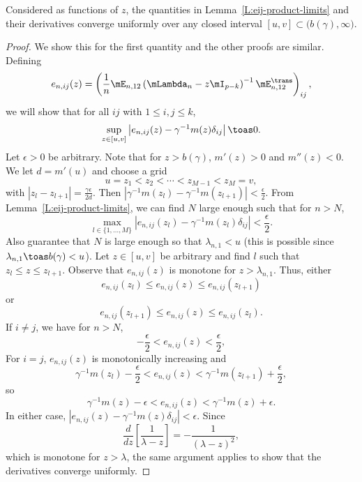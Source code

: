 \begin{lemma}\label{L:eij-product-limits-uniform}
    Considered as functions of $z$, the quantities in 
    Lemma~\ref{L:eij-product-limits} and their derivatives
    converge uniformly over any closed
    interval $[u,v] \subset \big( b(\gamma),\infty \big)$.
\end{lemma}
\begin{proof}
    We show this for the first quantity and the other proofs are similar.
    Defining
    \[
        e_{n,ij}(z)
        =
        \left(
            \frac{1}{n}
            \mE_{n,12}
            \left(
                \mLambda_n - z \mI_{p-k}
            \right)^{-1}
            \mE_{n,12}^\trans
        \right)_{ij},
    \]
    we will show that for all $ij$ with $1 \leq i,j \leq k$, 
    \[
        \sup_{z \in [u,v]} 
            \left|
                e_{n,ij}(z)
                    -
                    \gamma^{-1}
                    m(z)
                    \delta_{ij}
            \right|
            \toas 0.
    \]
    Let $\epsilon > 0$ be arbitrary.  Note that for 
    $z > b(\gamma)$, $m'(z) > 0$ and $m''(z) < 0$.  We let $d = m'(u)$ and
    choose a grid
    \[
        u = z_1 < z_2 < \cdots < z_{M-1} < z_M = v,
    \]
    with $|z_l - z_{l+1}| = \frac{\gamma \epsilon}{2 d}$.  
    Then $|\gamma^{-1} m(z_l) - \gamma^{-1} m(z_{l+1})| < \frac{\epsilon}{2}$.  
    From 
    Lemma~\ref{L:eij-product-limits}, we can find $N$ large enough such
    that for $n > N$, 
    \[
        \max_{l\in\{1, \ldots, M\}}
            \left|
                e_{n,ij}(z_l)
                    -
                    \gamma^{-1}
                    m(z_l)
                    \delta_{ij}
            \right|
            <
            \frac{\epsilon}{2}.
    \]
    Also guarantee that $N$ is large enough so that $\lambda_{n,1} < u$ 
    (this is possible since $\lambda_{n,1} \toas b(\gamma) < u$).
    Let $z \in [u,v]$ be arbitrary and find $l$ such that 
    $z_l \leq z \leq z_{l+1}$.
    Observe that $e_{n,ij}(z)$ is monotone for $z > \lambda_{n,1}$.  Thus,
    either
    \[
        e_{n,ij}(z_l) \leq e_{n,ij}(z) \leq e_{n,ij}(z_{l+1})
    \]
    or
    \[
        e_{n,ij}(z_{l+1}) \leq e_{n,ij}(z) \leq e_{n,ij}(z_{l}).
    \]
    If $i \neq j$, we have for $n > N$,
    \[
        -\frac{\epsilon}{2} < e_{n,ij}(z) < \frac{\epsilon}{2},
    \]
    For $i = j$, $e_{n,ij}(z)$ is 
    monotonically increasing and
    \[
        \gamma^{-1} m(z_l) - \frac{\epsilon}{2}
            <
                e_{n,ij}(z)
                    <
                        \gamma^{-1} m(z_{l+1}) + \frac{\epsilon}{2},
    \]
    so
    \[
        \gamma^{-1} m(z) - \epsilon
            <
                e_{n,ij}(z)
                    <
                        \gamma^{-1} m(z) + \epsilon.
    \]
    In either case, 
    $|e_{n,ij}(z) - \gamma^{-1} m(z) \delta_{ij}| < \epsilon$.
    Since 
    \[
        \frac{d}{dz} \left[
            \frac{1}{\lambda - z}
        \right]
            =
            -\frac{1}{(\lambda - z)^{2}},
    \]
    which is monotone for $z > \lambda$, the same argument applies to show
    that the derivatives converge uniformly.
\end{proof}

